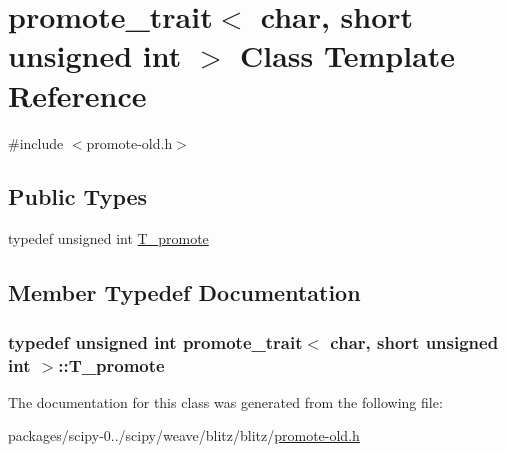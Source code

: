 \hypertarget{classpromote__trait_3_01char_00_01short_01unsigned_01int_01_4}{}\section{promote\+\_\+trait$<$ char, short unsigned int $>$ Class Template Reference}
\label{classpromote__trait_3_01char_00_01short_01unsigned_01int_01_4}


{\ttfamily \#include $<$promote-\/old.\+h$>$}

\subsection*{Public Types}
\begin{DoxyCompactItemize}
\item 
typedef unsigned int \hyperlink{classpromote__trait_3_01char_00_01short_01unsigned_01int_01_4_a0272362944a35dac746a4c76b096d85f}{T\+\_\+promote}
\end{DoxyCompactItemize}


\subsection{Member Typedef Documentation}
\hypertarget{classpromote__trait_3_01char_00_01short_01unsigned_01int_01_4_a0272362944a35dac746a4c76b096d85f}{}
\subsubsection[{T\+\_\+promote}]{\setlength{\rightskip}{0pt plus 5cm}typedef unsigned int {\bf promote\+\_\+trait}$<$ char, short unsigned int $>$\+::{\bf T\+\_\+promote}}\label{classpromote__trait_3_01char_00_01short_01unsigned_01int_01_4_a0272362944a35dac746a4c76b096d85f}


The documentation for this class was generated from the following file\+:\begin{DoxyCompactItemize}
\item 
packages/scipy-\/0../scipy/weave/blitz/blitz/\hyperlink{promote-old_8h}{promote-\/old.\+h}\end{DoxyCompactItemize}
